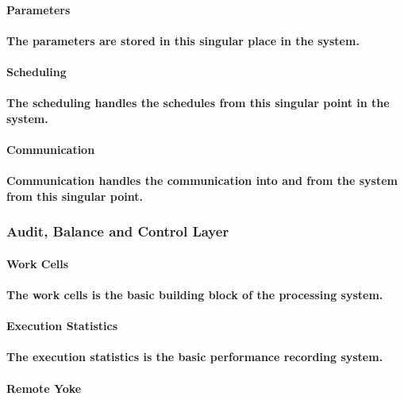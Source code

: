 \documentclass{acm_proc_article-sp}
\begin{document}
\paragraph{\textbf{Parameters}}
\paragraph{The parameters are stored in this singular place in the system.}
\paragraph{\textbf{Scheduling}}
\paragraph{The scheduling handles the schedules from this singular point in the system.}
\paragraph{\textbf{Communication}}
\paragraph{Communication handles the communication into and from the system from this singular point.}
\subsubsection{Audit, Balance and Control Layer}
\paragraph{\textbf{Work Cells}}
\paragraph{The work cells \cite{feld2000lean} is the basic building block of the processing system.}
\paragraph{\textbf{Execution Statistics}}
\paragraph{The execution statistics is the basic performance recording system.}
\paragraph{\textbf{Remote Yoke}}
\end{document}

